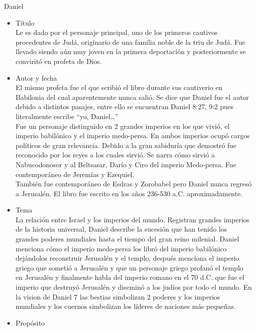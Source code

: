%
%
\begin{section}{Daniel}
	\begin{itemize}
		\item Título\\
			Le es dado por el personaje principal, uno de los primeros cautivos procedentes de Judá, originario de una familia noble de la triu de Judá. Fue llevado siendo aún muy joven en la primera deportación y posteriormente se conviritó en profeta de Dios.
		\item Autor y fecha\\
			El mismo profeta fue el que scribió el libro durante sus cautiverio en Babilonia del cual aparentemente nunca salió. Se dice que Daniel fue el autor debido a distintos pasajes, entre ello se encuentran Daniel 8:27, 9:2 pues literalmente escribe ``yo, Daniel\ldots''\\
			Fue un personaje distinguido en 2 grandes imperios en los que vivió, el imperio babilónico y el imperio medo-persa. En ambos imperios ocupó cargos políticos de gran relevancia. Debido a la gran sabiduría que demostró fue reconocido por los reyes a los cuales sirvió. Se narra cómo sirvió a Nabucodonosor y al Beltsasar, Darío y Ciro del imperio Medo-persa. Fue contemporáneo de Jeremías y Ezequiel.\\
		También fue contemporáneo de Esdras y Zorobabel pero Daniel nunca regresó a Jerusalén. El libro fue escrito en los años 236-530 a.C. aproximadamente.\\
	\item Tema\\
		La relación entre Israel y los imperios del mundo. Registran grandes imperios de la historia universal, Daniel describe la sucesión que han tenido los grandes poderes mundiales hasta el tiempo del gran reino milenial. Daniel menciona cómo el imperio medo-persa los libró del imperio babilónico dejándolos reconstruir Jerusalén y el templo, después menciona el imperio griego que sometió a Jerusalén y que un personaje griego profanó el templo en Jerusalén y finalmente habla del imperio romano en el 70 d.C. que fue el imperio que destruyó Jerusalén y diseminó a los judíos por todo el mundo. En la vision de Daniel 7 las bestias simbolizan 2 poderes y los imperios mundiales y los cuernos simbolizan los líderes de naciones más pequeñas.
	\item Propósito\\

\end{itemize}
\end{section}
